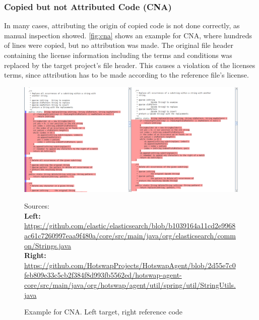 \subsubsection*{Copied but not Attributed Code (CNA)}
In many cases, attributing the origin of copied code is not done correctly, as manual inspection showed.
\autoref{fig:cna} shows an example for CNA, where hundreds of lines were copied, but no attribution was made.
The original file header containing the license information including the terms and conditions was replaced by the target project's file header.
This causes a violation of the licenses terms, since attribution has to be made according to the reference file's license.
\begin{figure}[htpb]
	\centering
	\includegraphics[width=\linewidth]{figures/cna.png}
	\caption{Example for CNA. Left target, right reference code}
	{
		\begin{flushleft}
			\tiny Sources:\\
			\textbf{Left:}
			\href{https://github.com/elastic/elasticsearch/blob/b1039164a11cd2e9968ac61c7260997eaa9f480a/core/src/main/java/org/elasticsearch/common/Strings.java}{https://github.com/elastic/elasticsearch/blob/b1039164a11cd2e9968ac61c7260997eaa9f480a/core/src/main/java/org/elasticsearch/common/Strings.java}\\
			\textbf{Right:}
			\href{https://github.com/HotswapProjects/HotswapAgent/blob/2d55e7c0feb809e33c5cb2f384f8d993fb5562ed/hotswap-agent-core/src/main/java/org/hotswap/agent/util/spring/util/StringUtils.java}{https://github.com/HotswapProjects/HotswapAgent/blob/2d55e7c0feb809e33c5cb2f384f8d993fb5562ed/hotswap-agent-core/src/main/java/org/hotswap/agent/util/spring/util/StringUtils.java}
		\end{flushleft}
	}
	\label{fig:cna}
\end{figure}

\newpage
